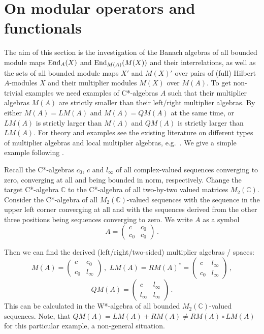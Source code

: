 \documentclass{amsart}
\theoremstyle{definition}
\begin{document}

\section{On modular operators and functionals}

The aim of this section is the investigation of the Banach algebras of all bounded module maps ${\rm End}_A(X)$ and ${\rm End}_{M(A)}(M(X))$ and their interrelations, as well as the sets of all bounded module maps $X'$ and $M(X)'$ over pairs of (full) Hilbert $A$-modules $X$ and their multiplier modules $M(X)$ over $M(A)$. To get non-trivial examples we need examples of C*-algebras $A$ such that their multiplier algebras $M(A)$ are strictly smaller than their left/right multiplier algebras. By \cite[Cor.~4.18]{Brown} either $M(A)=LM(A)$ and $M(A)=QM(A)$ at the same time, or $LM(A)$ is strictly larger than $M(A)$ and $QM(A)$ is strictly larger than $LM(A)$. For theory and examples see the existing literature on different types of multiplier algebras  and local multiplier algebras, e.g.~\cite{BMSh_1994}. We give a simple example following \cite[pp. 165-166]{Lin_1989}. 

Recall the C*-algebras $c_0$, $c$ and $l_\infty$ of all complex-valued sequences converging to zero, converging at all and being bounded in norm, respectively. Change the target C*-algebra $\mathbb C$ to the C*-algebra of all two-by-two valued matrices $M_2({\mathbb C})$. Consider the C*-algebra of all $M_2({\mathbb C})$-valued sequences with the sequence in the upper left corner converging at all and with the sequences derived from the other three positions being sequences converging to zero. We write $A$ as a symbol 
\[
 A = \left(   
\begin{array}{cc}
  c & c_0 \\ c_0 & c_0  
\end{array}
\right) \, .
\]

Then we can find the derived (left/right/two-sided) multiplier algebras / spaces:
\[
 M(A) = \left(   
\begin{array}{cc}
  c & c_0 \\ c_0 & l_\infty 
\end{array}
\right) \, ,  \,\, 
 LM(A) = RM(A)^* = \left(   
\begin{array}{cc}
  c & l_\infty \\ c_0 & l_\infty 
\end{array} 
\right) \, ,  
\]
\[
 QM(A) = \left(   
\begin{array}{cc}
  c & l_\infty \\ l_\infty & l_\infty 
\end{array} 
\right) \, .
\]
This can be calculated in the W*-algebra of all bounded $M_2({\mathbb C})$-valued sequences. Note, that $QM(A) = LM(A) + RM(A) \not= RM(A) \circ LM(A)$ for this particular example, a non-general situation. 
\end{document}
